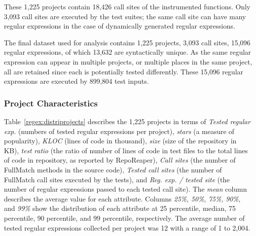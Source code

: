 These 1,225 projects contain  18,426 call sites of the instrumented functions. Only 3,093 call sites are executed by the test suites; the same call site can have many regular expressions in the case of dynamically generated regular expressions. 


The final dataset used for analysis contains 1,225 projects, 3,093 call sites, 15,096 regular expressions, of which 13,632 are syntactically unique. As the same regular expression can appear in multiple projects, or multiple places in the same project, all are retained since each is potentially tested differently. These 15,096 regular expressions are executed by 899,804 test inputs. %

\subsubsection{Project Characteristics}
Table~\ref{regex:distriprojects} describes the 1,225 projects in terms of {\em Tested regular exp.} (numbers of tested regular expressions per project), {\em stars} (a measure of popularity), {\em KLOC} (lines of code in thousand), {\em size} (size of the repository in KB),  {\em test ratio} (the ratio of number of lines of code in test files to the total lines of code in repository, as reported by RepoReaper), \emph{Call sites} (the number of FullMatch methods in the source code), \emph{Tested call sites} (the number of FullMatch call sites executed by the tests), and \emph{Reg. exp. / tested site} (the number of regular expressions passed to each tested call site). 
The \emph{mean} column describes the average value for each attribute. Columns {\em 25\%, 50\%, 75\%, 90\%}, and {\em 99\%} show the distribution of each attribute at 25 percentile, median, 75 percentile, 90 percentile, and 99 percentile, respectively. 
The average number of tested regular expressions collected per project was 12 with a range of 1 to 2,004. %

